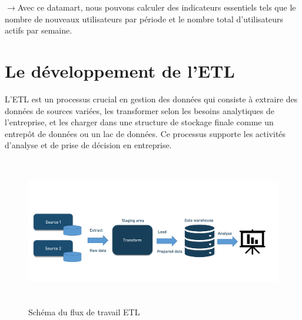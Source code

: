 $\rightarrow$Avec ce datamart, nous pouvons calculer des indicateurs essentiels tels que le nombre de nouveaux utilisateurs par période et le nombre total d'utilisateurs actifs par semaine.





















\newpage
\section{Le développement de l’ETL}

L'ETL est un processus crucial en gestion des données qui consiste à extraire des données de sources variées, les transformer selon les besoins analytiques de l'entreprise, et les charger dans une structure de stockage finale comme un entrepôt de données ou un lac de données. Ce processus supporte les activités d'analyse et de prise de décision en entreprise.

\begin{figure}[h!]

    \centering
    \includegraphics[width=1.05\textwidth, height=6.5cm]{chap6.images/etl-pipeline 1.png}
    \caption{ Schéma du flux de travail ETL } 


\end{figure}

